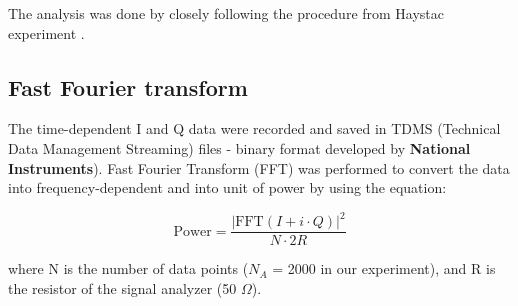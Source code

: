     The analysis was done by closely following the procedure from Haystac experiment \cite{}. 

\subsection{Fast Fourier transform}
The time-dependent I and Q data were recorded and saved in TDMS (Technical Data Management Streaming) files - binary format developed by \textbf{National Instruments}). Fast Fourier Transform (FFT) was performed to convert the data into frequency-dependent and into unit of power by using the equation:

\begin{equation}
\label{eq:4.1}
    \text{Power} = \frac{|\text{FFT}(I+i \cdot Q)|^{2}}{N \cdot 2R}
\end{equation}

where N is the number of data points ($N_A $ = 2000 in our experiment), and R is the resistor of the signal analyzer (50 $\Omega$).


